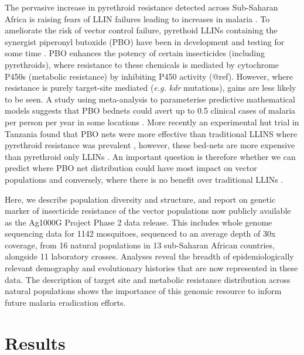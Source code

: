 \documentclass[a4paper,11pt,abstracton,hidelinks]{scrartcl}
\begin{document}
The pervasive increase in pyrethroid resistance detected across Sub-Saharan Africa is raising fears of LLIN failures leading to increases in malaria \cite{churcher2016, Hemingway2016}.
%
To ameliorate the risk of vector control failure, pyrethoid LLINs containing the synergist piperonyl butoxide (PBO) have been in development and testing for some time \cite{darriet2011, protopopoff2018}.
%
PBO enhances the potency of certain insecticides (including pyrethroids), where resistance to these chemicals is mediated by cytochrome P450s (metabolic resistance) by inhibiting P450 activity (@ref).
%
However, where resistance is purely target-site mediated (\textit{e.g. kdr} mutations), gains are less likely to be seen.
%
A study using  meta-analysis to parameterise predictive mathematical models suggests that PBO bednets could avert up to 0.5 clinical cases of malaria per person per year in some locations \cite{churcher2016}.
%
More recently an experimental hut trial in Tanzania found that PBO nets were more effective than traditional LLINS where pyrethroid resistance was prevalent \cite{protopopoff2018}, however, these bed-nets are more expensive than pyrethroid only LLINs \cite{churcher2016}.
%
An important question is therefore whether we can predict where PBO net distribution could have most impact on vector populations and conversely, where there is no benefit over traditional LLINs \cite{protopopoff2018, toe2018}.


Here, we describe population diversity and structure, and report on genetic marker of insecticide resistance   of the vector populations now publicly available as the Ag1000G Project Phase 2 data release.
%
This includes whole genome sequencing data for 1142 mosquitoes, sequenced to an average depth of 30x coverage, from 16 natural populations in 13 sub-Saharan African countries, alongside 11 laboratory crosses.
%
Analyses reveal the breadth of epidemiologically relevant demography and evolutionary histories that are now represented in these data.
%
The description of target site and metabolic resistance distribution across natural populations shows the importance of this genomic resource to inform future malaria eradication efforts.



\section*{Results}
\end{document}
